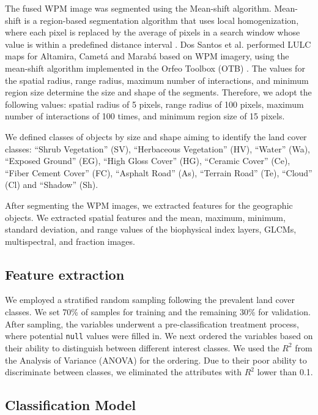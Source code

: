 \documentclass[preprint, 3p,
authoryear]{elsarticle} %
\begin{document}
The fused WPM image was segmented using the Mean-shift algorithm.
Mean-shift is a region-based segmentation algorithm that uses local
homogenization, where each pixel is replaced by the average of pixels in
a search window whose value is within a predefined distance interval
\citep{Comaniciu1997}. Dos Santos et al. \citeyearpar{Santos2022}
performed LULC maps for Altamira, Cametá and Marabá based on WPM
imagery, using the mean-shift algorithm implemented in the Orfeo Toolbox
(OTB) \citep{Grizonnet2017}. The values for the spatial radius, range
radius, maximum number of interactions, and minimum region size
determine the size and shape of the segments. Therefore, we adopt the
following values: spatial radius of 5 pixels, range radius of 100
pixels, maximum number of interactions of 100 times, and minimum region
size of 15 pixels.

We defined classes of objects by size and shape aiming to identify the
land cover classes: ``Shrub Vegetation'' (SV), ``Herbaceous Vegetation''
(HV), ``Water'' (Wa), ``Exposed Ground'' (EG), ``High Gloss Cover''
(HG), ``Ceramic Cover'' (Ce), ``Fiber Cement Cover'' (FC), ``Asphalt
Road'' (As), ``Terrain Road'' (Te), ``Cloud'' (Cl) and ``Shadow'' (Sh).

After segmenting the WPM images, we extracted features for the
geographic objects. We extracted spatial features and the mean, maximum,
minimum, standard deviation, and range values of the biophysical index
layers, GLCMs, multispectral, and fraction images.

\hypertarget{feature-extraction}{%
\subsection{Feature extraction}\label{feature-extraction}}

We employed a stratified random sampling following the prevalent land
cover classes. We set 70\% of samples for training and the remaining
30\% for validation. After sampling, the variables underwent a
pre-classification treatment process, where potential \texttt{null}
values were filled in. We next ordered the variables based on their
ability to distinguish between different interest classes. We used the
\(R^2\) from the Analysis of Variance (ANOVA) for the ordering. Due to
their poor ability to discriminate between classes, we eliminated the
attributes with \(R^2\) lower than 0.1.

\hypertarget{classification-model}{%
\subsection{Classification Model}\label{classification-model}}
\end{document}
